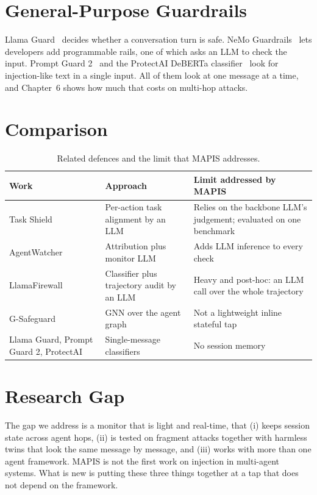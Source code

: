 \section{General-Purpose Guardrails}
Llama Guard~\cite{inan2023} decides whether a conversation turn is safe. NeMo Guardrails~\cite{rebedea2023} lets developers add programmable rails, one of which asks an LLM to check the input. Prompt Guard 2~\cite{promptguard2025} and the ProtectAI DeBERTa classifier~\cite{protectai2024} look for injection-like text in a single input. All of them look at one message at a time, and Chapter~6 shows how much that costs on multi-hop attacks.

\section{Comparison}
\begin{table}[H]
\centering
\small
\begin{tabular}{p{3.2cm}p{4.2cm}p{5.6cm}}
\toprule
Work & Approach & Limit addressed by MAPIS\\
\midrule
Task Shield & Per-action task alignment by an LLM & Relies on the backbone LLM's judgement; evaluated on one benchmark\\
AgentWatcher & Attribution plus monitor LLM & Adds LLM inference to every check\\
LlamaFirewall & Classifier plus trajectory audit by an LLM & Heavy and post-hoc: an LLM call over the whole trajectory\\
G-Safeguard & GNN over the agent graph & Not a lightweight inline stateful tap\\
Llama Guard, Prompt Guard 2, ProtectAI & Single-message classifiers & No session memory\\
\bottomrule
\end{tabular}
\caption{Related defences and the limit that MAPIS addresses.}
\end{table}

\section{Research Gap}
The gap we address is a monitor that is light and real-time, that (i) keeps session state across agent hops, (ii) is tested on fragment attacks together with harmless twins that look the same message by message, and (iii) works with more than one agent framework. MAPIS is not the first work on injection in multi-agent systems. What is new is putting these three things together at a tap that does not depend on the framework.
